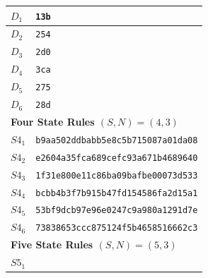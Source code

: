 \documentclass{elsarticle}
\begin{document}
\begin{multicols}{2}
\begin{table}[!htbp]
\begin{tabular}{|p{2cm}|l|}
$D_{1}$ &   \verb|13b| \\ \hline
$D_{2}$ &   \verb|254| \\ \hline
$D_{3}$ &   \verb|2d0| \\ \hline
$D_{4}$ &   \verb|3ca| \\ \hline
$D_{5}$ &   \verb|275| \\ \hline
$D_{6}$ &   \verb|28d| \\ \hline
\multicolumn{2}{|l|}{\textbf{Four State Rules \boldmath$(S,N) = (4,3)$}} \\ 
\hline
$S4_{1}$ &   \verb|b9aa502ddbabb5e8c5b715087a01da08| \\ \hline
$S4_{2}$ &   \verb|e2604a35fca689cefc93a671b4689640| \\ \hline
$S4_{3}$ &   \verb|1f31e800e11c86ba09bafbe00073d533|\\ \hline
$S4_{4}$ &   \verb|bcbb4b3f7b915b47fd154586fa2d15a1|\\ \hline
$S4_{5}$ &   \verb|53bf9dcb97e96e0247c9a980a1291d7e| \\ \hline
$S4_{6}$ &   \verb|73838653ccc875124f5b4658516662c3|\\
\hline
\multicolumn{2}{|l|}{\textbf{Five State Rules \boldmath$(S,N) = (5,3)$}} \\ 
\hline
 $S5_{1}$ & %

\end{tabular}
\end{table}
\end{multicols}
\end{document}
